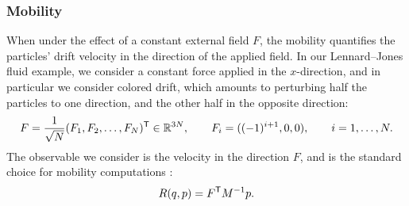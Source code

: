 \subsubsection{Mobility}
\label{subsubsec:mobility_num}
%
When under the effect of a constant external field $F$, the mobility quantifies the particles' drift velocity in the direction of the applied field. In our Lennard--Jones fluid example, we consider a constant force applied in the $x$-direction, and in particular we consider colored drift, which amounts to perturbing half the particles to one direction, and the other half in the opposite direction:
%
\begin{equation}
	F = \frac{1}{\sqrt{N}}(F_1,F_2,\dotsc,F_N)^\mathsf T \in \mathbb{R}^{3N}, \qquad F_i = ((-1)^{i+1}, 0, 0), \qquad i = 1,\dotsc,N.
\end{equation}
%
The observable we consider is the velocity in the direction $F$, and is the standard choice for mobility computations \cite[Section 5.2.2]{acta_numerica2016}:
%
\begin{equation}
	R(q,p) = F^\mathsf T M^{-1}p.
\end{equation}
%
%
